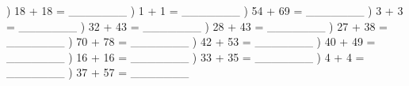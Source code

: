 \documentclass{article}%
\begin{document}
\newline%
) 18 + 18 = \_\_\_\_\_\_\_%
\newline%
\newline%
) 1 + 1 = \_\_\_\_\_\_\_%
\newline%
\newline%
) 54 + 69 = \_\_\_\_\_\_\_%
\newline%
\newline%
) 3 + 3 = \_\_\_\_\_\_\_%
\newline%
\newline%
) 32 + 43 = \_\_\_\_\_\_\_%
\newline%
\newline%
) 28 + 43 = \_\_\_\_\_\_\_%
\newline%
\newline%
) 27 + 38 = \_\_\_\_\_\_\_%
\newline%
\newline%
) 70 + 78 = \_\_\_\_\_\_\_%
\newline%
\newline%
) 42 + 53 = \_\_\_\_\_\_\_%
\newline%
\newline%
) 40 + 49 = \_\_\_\_\_\_\_%
\newline%
\newline%
) 16 + 16 = \_\_\_\_\_\_\_%
\newline%
\newline%
) 33 + 35 = \_\_\_\_\_\_\_%
\newline%
\newline%
) 4 + 4 = \_\_\_\_\_\_\_%
\newline%
\newline%
) 37 + 57 = \_\_\_\_\_\_\_%
\newline%
\newline%
\newline%
\end{document}

